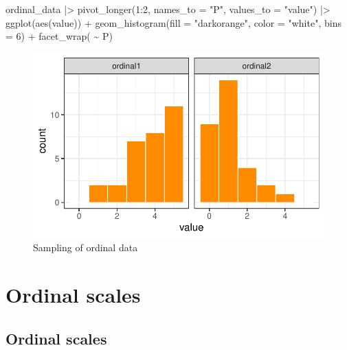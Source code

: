 \documentclass[
  letterpaper,
  DIV=11,
  numbers=noendperiod]{scrreprt}
\newenvironment{Shaded}{\begin{snugshade}}{\end{snugshade}}
\newcommand{\AttributeTok}[1]{\textcolor[rgb]{0.40,0.45,0.13}{#1}}
\newcommand{\DecValTok}[1]{\textcolor[rgb]{0.68,0.00,0.00}{#1}}
\newcommand{\FunctionTok}[1]{\textcolor[rgb]{0.28,0.35,0.67}{#1}}
\newcommand{\NormalTok}[1]{\textcolor[rgb]{0.00,0.23,0.31}{#1}}
\newcommand{\SpecialCharTok}[1]{\textcolor[rgb]{0.37,0.37,0.37}{#1}}
\newcommand{\StringTok}[1]{\textcolor[rgb]{0.13,0.47,0.30}{#1}}
\begin{document}
\begin{Shaded}
\begin{Highlighting}[]
\NormalTok{ordinal\_data }\SpecialCharTok{|\textgreater{}}
  \FunctionTok{pivot\_longer}\NormalTok{(}\DecValTok{1}\SpecialCharTok{:}\DecValTok{2}\NormalTok{, }\AttributeTok{names\_to =} \StringTok{"P"}\NormalTok{,}
               \AttributeTok{values\_to =} \StringTok{"value"}\NormalTok{) }\SpecialCharTok{|\textgreater{}}
  \FunctionTok{ggplot}\NormalTok{(}\FunctionTok{aes}\NormalTok{(value)) }\SpecialCharTok{+}
  \FunctionTok{geom\_histogram}\NormalTok{(}\AttributeTok{fill =} \StringTok{"darkorange"}\NormalTok{,}
                 \AttributeTok{color =} \StringTok{"white"}\NormalTok{,}
                 \AttributeTok{bins =} \DecValTok{6}\NormalTok{) }\SpecialCharTok{+}
  \FunctionTok{facet\_wrap}\NormalTok{( }\SpecialCharTok{\textasciitilde{}}\NormalTok{ P) }
\end{Highlighting}
\end{Shaded}

\begin{figure}[H]

{\centering \includegraphics{data-terminology_files/figure-pdf/fig-ordinal-1.pdf}

}

\caption{\label{fig-ordinal}Sampling of ordinal data}

\end{figure}

\hypertarget{ordinal-scales}{%
\chapter{Ordinal scales}\label{ordinal-scales}}

\hypertarget{ordinal-scales-1}{%
\section{Ordinal scales}\label{ordinal-scales-1}}
\end{document}
